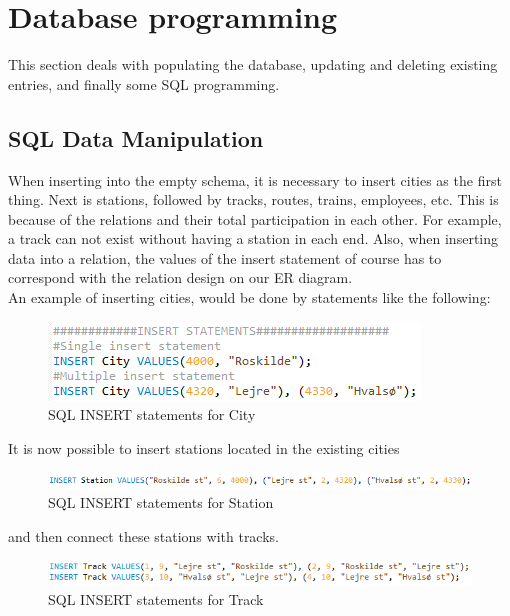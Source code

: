 \section{Database programming}\label{sec:prog}
This section deals with populating the database, updating and deleting existing 
entries, and finally some SQL programming.

\subsection{SQL Data Manipulation}
When inserting into the empty schema, it is necessary to insert cities as the 
first thing. Next is stations, followed by tracks, routes, trains, employees, 
etc. This is because of the relations and their total participation in each 
other. For example, a track can not exist without having a station in each 
end.
Also, when inserting data into a relation, the values of the insert statement 
of course has to correspond with the relation design on our ER diagram.\\
An example of inserting cities, would be done by statements like the following:

\begin{figure}[ht!]
    \centering
    \includegraphics[width=.6\textwidth]{img/INSERT_Statements}
    \caption{SQL INSERT statements for City}
\end{figure}

It is now possible to insert stations located in the existing cities

\begin{figure}[ht!]
    \centering
    \includegraphics[width=1\textwidth]{img/INSERT_Statement_Station}
    \caption{SQL INSERT statements for Station}
\end{figure}

and then connect these stations with tracks.

\begin{figure}[ht!]
    \centering
    \includegraphics[width=1\textwidth]{img/INSERT_Statements_Track}
    \caption{SQL INSERT statements for Track}
\end{figure}

